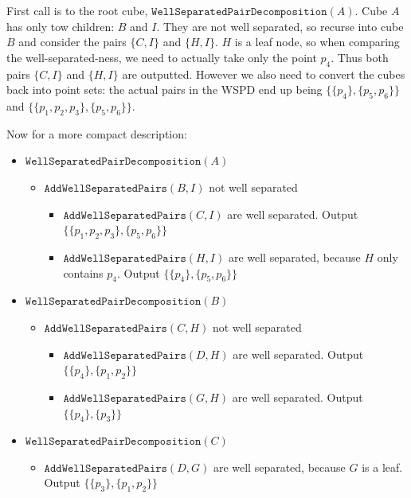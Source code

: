 \documentclass{article}
\begin{document}
  First call is to the root cube, $\texttt{WellSeparatedPairDecomposition}(A)$.
  Cube $A$ has only tow children: $B$ and $I$.
  They are not well separated, so recurse into cube $B$ and consider the pairs $\{C, I\}$ and $\{H, I\}$.
  $H$ is a leaf node, so when comparing the well-separated-ness, we need to actually take only the point $p_4$.
  Thus both pairs $\{C, I\}$ and $\{H, I\}$ are outputted.
  However we also need to convert the cubes back into point sets:
  the actual pairs in the WSPD end up being $\{\{p_4\}, \{p_5, p_6\}\}$ and $\{\{p_1, p_2, p_3\}, \{p_5, p_6\}\}$.

  Now for a more compact description:
  \begin{itemize}
    \item $\texttt{WellSeparatedPairDecomposition}(A)$
    \begin{itemize}
      \item $\texttt{AddWellSeparatedPairs}(B, I)$ not well separated
      \begin{itemize}
        \item $\texttt{AddWellSeparatedPairs}(C, I)$ are well separated. Output $\{\{p_1, p_2, p_3\}, \{p_5, p_6\}\}$
        \item $\texttt{AddWellSeparatedPairs}(H, I)$ are well separated, because $H$ only contains $p_4$. Output $\{\{p_4\}, \{p_5, p_6\}\}$
      \end{itemize}
    \end{itemize}
    \item $\texttt{WellSeparatedPairDecomposition}(B)$
    \begin{itemize}
      \item $\texttt{AddWellSeparatedPairs}(C, H)$ not well separated
      \begin{itemize}
        \item $\texttt{AddWellSeparatedPairs}(D, H)$ are well separated. Output $\{\{p_4\}, \{p_1, p_2\}\}$
        \item $\texttt{AddWellSeparatedPairs}(G, H)$ are well separated. Output $\{\{p_4\}, \{p_3\}\}$
      \end{itemize}
    \end{itemize}
    \item $\texttt{WellSeparatedPairDecomposition}(C)$
    \begin{itemize}
      \item $\texttt{AddWellSeparatedPairs}(D, G)$ are well separated, because $G$ is a leaf. Output $\{\{p_3\}, \{p_1, p_2\}\}$
    \end{itemize}

\end{itemize}
\end{document}

